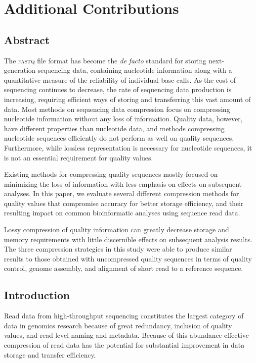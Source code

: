 
\renewcommand{\thechapter}{3}

\chapter{Additional Contributions}

\section{Abstract}


The \textsc{fastq} file format has become the \emph{de facto} standard
for storing next-generation sequencing data, containing nucleotide
information along with a quantitative measure of the reliability of
individual base calls. As the cost of sequencing continues to
decrease, the rate of sequencing data production is increasing,
requiring efficient ways of storing and transferring this vast amount
of data. Most methods on sequencing data compression focus on
compressing nucleotide information without any loss of information.
Quality data, however, have different properties than nucleotide data,
and methods compressing nucleotide sequences efficiently do not
perform as well on quality sequences. Furthermore, while lossless
representation is necessary for nucleotide sequences, it is not an
essential requirement for quality values.

Existing methods for compressing quality sequences mostly focused on
minimizing the loss of information with less emphasis on effects on
subsequent analyses. In this paper, we evaluate several different
compression methods for quality values that compromise accuracy for
better storage efficiency, and their resulting impact on common
bioinformatic analyses using sequence read data.

Lossy compression of quality information can greatly decrease storage
and memory requirements with little discernible effects on subsequent
analysis results. The three compression strategies in this study were
able to produce similar results to those obtained with uncompressed
quality sequences in terms of quality control, genome assembly, and
alignment of short read to a reference sequence.

\section{Introduction}

Read data from high-throughput sequencing constitutes the largest
category of data in genomics research because of great redundancy,
inclusion of quality values, and read-level naming and
metadata. Because of this abundance effective compression of read data
has the potential for substantial improvement in data storage and
transfer efficiency.

